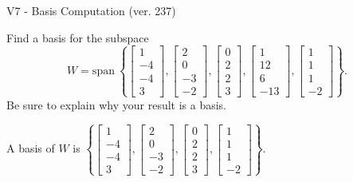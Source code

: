 \begin{exercise}
  \begin{exerciseTitle}V7 - Basis Computation (ver. 237)\end{exerciseTitle}
  \begin{exerciseStatement}
    Find a basis for the subspace 
\[W=\mathrm{span}\ \left\{\left[\begin{array}{r}
1 \\
-4 \\
-4 \\
3
\end{array}\right] , \left[\begin{array}{r}
2 \\
0 \\
-3 \\
-2
\end{array}\right] , \left[\begin{array}{r}
0 \\
2 \\
2 \\
3
\end{array}\right] , \left[\begin{array}{r}
1 \\
12 \\
6 \\
-13
\end{array}\right] , \left[\begin{array}{r}
1 \\
1 \\
1 \\
-2
\end{array}\right]\right\}.\]
 Be sure to explain why your result is a basis.


  \end{exerciseStatement}
  \begin{exerciseAnswer}
   A basis of \(W\) is  \(\left\{\left[\begin{array}{r}
1 \\
-4 \\
-4 \\
3
\end{array}\right] , \left[\begin{array}{r}
2 \\
0 \\
-3 \\
-2
\end{array}\right] , \left[\begin{array}{r}
0 \\
2 \\
2 \\
3
\end{array}\right] , \left[\begin{array}{r}
1 \\
1 \\
1 \\
-2
\end{array}\right]\right\}\).
  


  \end{exerciseAnswer}
\end{exercise}